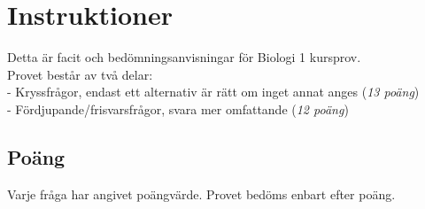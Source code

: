 \documentclass{exam}
\begin{document}
\section*{Instruktioner}
Detta är facit och bedömningsanvisningar för Biologi 1 kursprov.\\
Provet består av två delar:\\
- Kryssfrågor, endast ett alternativ är rätt om inget annat anges (\textit{13 poäng})\\
- Fördjupande/frisvarsfrågor, svara mer omfattande (\textit{12 poäng})

\subsection*{Poäng}
Varje fråga har angivet poängvärde. Provet bedöms enbart efter poäng.\\
\end{document}
